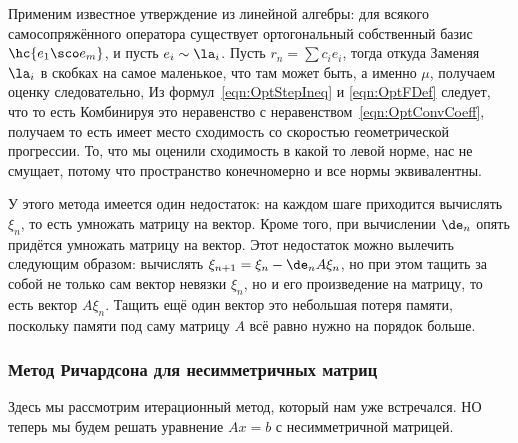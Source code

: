 \documentclass[a4paper]{article}
\begin{document}
Применим известное утверждение из линейной алгебры: для всякого
самосопряжённого оператора существует ортогональный собственный базис
$\hc{e_1\sco e_m}$, и пусть $e_i \sim \la_i$.  Пусть $r_n = \sum c_i
e_i$, тогда 
откуда   Заменяя $\la_i$ в скобках на самое
маленькое, что там может быть, а именно $\mu$, получаем оценку
 следовательно,
  Из формул~\eqref{eqn:OptStepIneq} и
\eqref{eqn:OptFDef} следует, что  то есть 
Комбинируя это неравенство с неравенством~\eqref{eqn:OptConvCoeff},
получаем 
то есть имеет место сходимость со скоростью геометрической прогрессии.
То, что мы оценили сходимость в какой то левой норме, нас не смущает,
потому что пространство конечномерно и все нормы эквивалентны.

У этого метода имеется один недостаток: на каждом шаге приходится
вычислять $\xi_n$, то есть умножать матрицу на вектор. Кроме того, при
вычислении $\de_n$ опять придётся умножать матрицу на вектор. Этот
недостаток можно вылечить следующим образом: вычислять $\xi_{n+1} =
\xi_n - \de_n A \xi_n$, но при этом тащить за собой не только сам
вектор невязки $\xi_n$, но и его произведение на матрицу, то есть
вектор $A\xi_n$. Тащить ещё один вектор это небольшая потеря памяти,
поскольку памяти под саму матрицу $A$ всё равно нужно на порядок
больше.

\subsubsection{Метод Ричардсона для несимметричных матриц}

Здесь мы рассмотрим итерационный метод, который нам уже встречался. НО
теперь мы будем решать уравнение $Ax = b$ с несимметричной матрицей.
\end{document}
